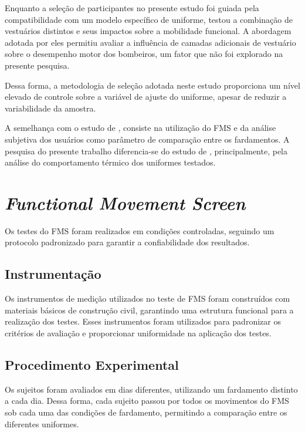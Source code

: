 Enquanto a seleção de participantes no presente estudo foi guiada pela compatibilidade com 
um modelo específico de uniforme, \textcite{orr2019impact} testou a combinação de vestuários 
distintos e seus impactos sobre a mobilidade funcional. A abordagem adotada por eles permitiu 
avaliar a influência de camadas adicionais de vestuário sobre o desempenho motor dos bombeiros, 
um fator que não foi explorado na presente pesquisa.

Dessa forma, a metodologia de seleção adotada neste estudo proporciona um nível elevado de 
controle sobre a variável de ajuste do uniforme, apesar de reduzir a variabilidade da amostra.

A semelhança com o estudo de \textcite{orr2019impact}, consiste na utilização do \acrshort{FMS} e 
da análise subjetiva dos usuários como parâmetro de comparação entre os fardamentos. A pesquisa 
do presente trabalho diferencia-se do estudo de \textcite{orr2019impact}, principalmente, 
pela análise do comportamento térmico dos uniformes testados.


\section{\textit{Functional Movement Screen}}

Os testes do \acrlong{FMS} foram realizados em condições controladas, seguindo um protocolo 
padronizado para garantir a confiabilidade dos resultados. 

\subsection{Instrumentação}
Os instrumentos de medição utilizados no teste de \acrshort{FMS} foram construídos com materiais 
básicos de construção civil, garantindo uma estrutura funcional para a realização dos testes. 
Esses instrumentos foram utilizados para padronizar os critérios de avaliação e proporcionar 
uniformidade na aplicação dos testes. 

\begin{centering}
\end{centering}

\subsection{Procedimento Experimental}
Os sujeitos foram avaliados em dias diferentes, utilizando um fardamento distinto a cada dia. 
Dessa forma, cada sujeito passou por todos os movimentos do \acrshort{FMS} sob cada uma das condições 
de fardamento, permitindo a comparação entre os diferentes uniformes.

